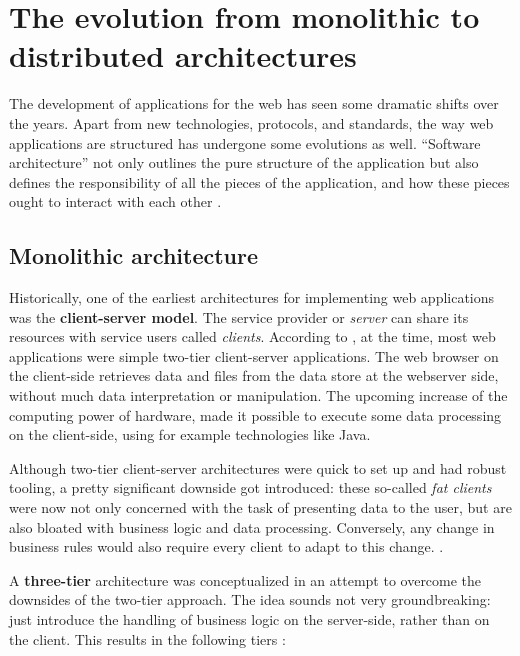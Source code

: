 \section{The evolution from monolithic to distributed architectures}


The development of applications for the web has seen some dramatic shifts over
the years. Apart from new technologies, protocols, and standards, the way web
applications are structured has undergone some evolutions as well. ``Software
architecture'' not only outlines the pure structure of the application but also
defines the responsibility of all the pieces of the application, and how these
pieces ought to interact with each other \autocite{Fedorov_etal_1998}.


\subsection{Monolithic architecture}

Historically, one of the earliest architectures for implementing web
applications was the \textbf{client-server model}. The service provider or
\textit{server} can share its resources with service users called
\textit{clients}. According to \textcite{Reese_2000}, at the time, most web
applications were simple two-tier client-server applications. The web browser on
the client-side retrieves data and files from the data store at the webserver
side, without much data interpretation or manipulation. The upcoming increase of
the computing power of hardware, made it possible to execute some data
processing on the client-side, using for example technologies like Java. 

Although two-tier client-server architectures were quick to set up and had
robust tooling, a pretty significant downside got introduced: these so-called
\textit{fat clients} were now not only concerned with the task of presenting
data to the user, but are also bloated with business logic and data processing.
Conversely, any change in business rules would also require every client to adapt
to this change. \autocite{Gallaugher_Ramanathan_1996}.

A \textbf{three-tier} architecture was conceptualized in an attempt to overcome
the downsides of the two-tier approach. The idea sounds not very groundbreaking:
just introduce the handling of business logic on the server-side, rather than on
the client. This results in the following tiers \autocite{Aarsten_etal_1996}:

